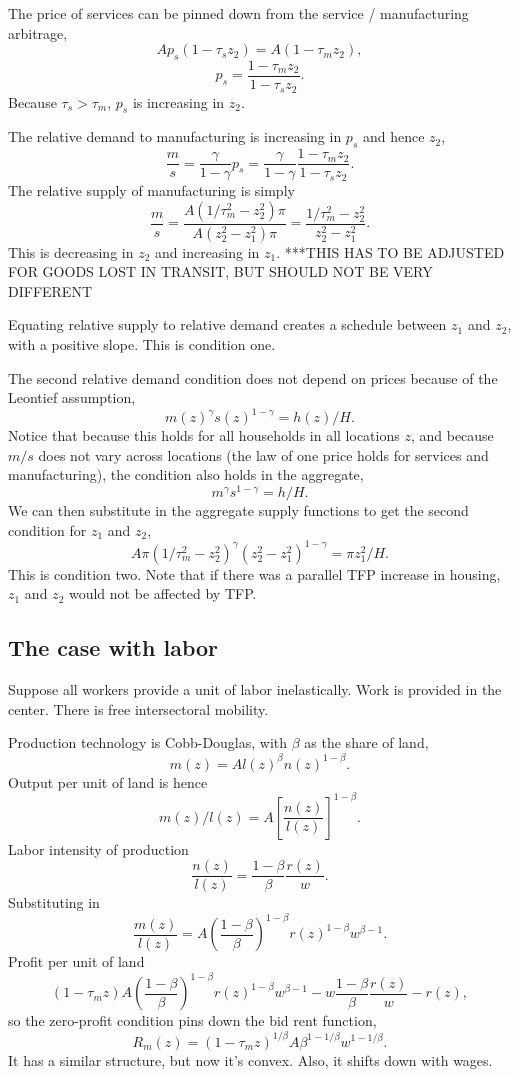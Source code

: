 \documentclass[letter]{amsart}
\theoremstyle{definition}
\theoremstyle{remark}
\numberwithin{equation}{section}
\begin{document}
The price of services can be pinned down from the service / manufacturing arbitrage,
\[
Ap_s(1-\tau_s z_2) = A(1-\tau_m z_2),
\]
\[
p_s = \frac{1-\tau_m z_2}{1-\tau_s z_2}.
\]
Because $\tau_s>\tau_m$, $p_s$ is increasing in $z_2$.

The relative demand to manufacturing is increasing in $p_s$ and hence $z_2$,
\[
\frac{m}{s} = \frac{\gamma}{1-\gamma}p_s = \frac{\gamma}{1-\gamma}\frac{1-\tau_m z_2}{1-\tau_s z_2}.
\]
The relative supply of manufacturing is simply
\[
\frac{m}{s} = \frac{A(1/\tau_m^2-z_2^2)\pi}{A(z_2^2-z_1^2)\pi} = \frac{1/\tau_m^2-z_2^2}{z_2^2-z_1^2}.
\]
This is decreasing in $z_2$ and increasing in $z_1$. ***THIS HAS TO BE ADJUSTED FOR GOODS LOST IN TRANSIT, BUT SHOULD NOT BE VERY DIFFERENT

Equating relative supply to relative demand creates a schedule between $z_1$ and $z_2$, with a positive slope. This is condition one.

The second relative demand condition does not depend on prices because of the Leontief assumption,
\[
m(z)^\gamma s(z)^{1-\gamma} = h(z)/H.
\]
Notice that because this holds for all households in all locations $z$, and because $m/s$ does not vary across locations (the law of one price holds for services and manufacturing), the condition also holds in the aggregate,
\[
m^\gamma s^{1-\gamma} = h/H.
\]
We can then substitute in the aggregate supply functions to get the second condition for $z_1$ and $z_2$,
\[
A\pi (1/\tau_m^2-z_2^2)^\gamma(z_2^2-z_1^2)^{1-\gamma} = \pi z_1^2/H.
\]
This is condition two. Note that if there was a parallel TFP increase in housing, $z_1$ and $z_2$ would not be affected by TFP.

\subsection{The case with labor}
Suppose all workers provide a unit of labor inelastically. Work is provided in the center. There is free intersectoral mobility.

Production technology is Cobb-Douglas, with $\beta$ as the share of land,
\[
m(z) = A l(z)^\beta n(z)^{1-\beta}.
\]
Output per unit of land is hence
\[
m(z)/l(z) = A \left[\frac{n(z)}{l(z)}\right]^{1-\beta}.
\]
Labor intensity of production
\[
\frac{n(z)}{l(z)} = \frac{1-\beta}{\beta}\frac{r(z)}{w}.
\]
Substituting in
\[
\frac{m(z)}{l(z)} = A \left(\frac{1-\beta}{\beta}\right)^{1-\beta}r(z)^{1-\beta}w^{\beta-1}.
\]
Profit per unit of land
\[
(1-\tau_m z)A \left(\frac{1-\beta}{\beta}\right)^{1-\beta}r(z)^{1-\beta}w^{\beta-1} - w\frac{1-\beta}{\beta}\frac{r(z)}{w} - r(z),
\]
so the zero-profit condition pins down the bid rent function,
\[
R_m(z) = (1-\tau_m z)^{1/\beta}A {\beta}^{1-1/\beta}w^{1-1/\beta}.
\]
It has a similar structure, but now it's convex. Also, it shifts down with wages.
\end{document}
